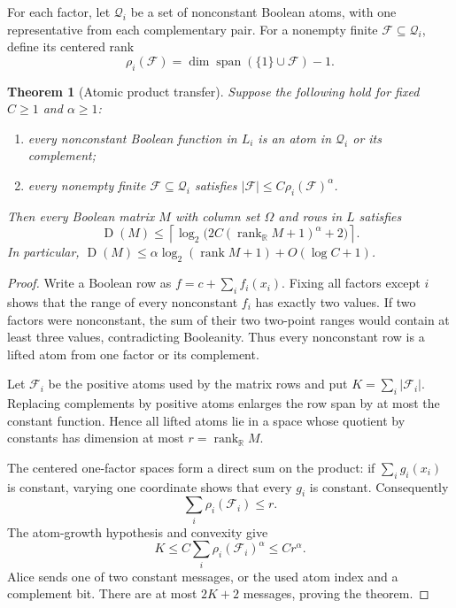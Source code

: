 \documentclass[11pt]{article}
\newtheorem{theorem}{Theorem}[section]
\theoremstyle{definition}
\theoremstyle{remark}
\newcommand{\R}{\mathbb R}
\newcommand{\1}{\mathbf 1}
\newcommand{\rank}{\operatorname{rank}}
\newcommand{\Dcc}{\operatorname{D}}
\begin{document}
For each factor, let $\mathcal Q_i$ be a set of nonconstant Boolean atoms,
with one representative from each complementary pair.  For a nonempty
finite $\mathcal F\subseteq\mathcal Q_i$, define its centered rank
\[
 \rho_i(\mathcal F)
 =\dim\operatorname{span}(\{1\}\cup\mathcal F)-1.
\]

\begin{theorem}[Atomic product transfer]\label{thm:atomic-transfer}
Suppose the following hold for fixed $C\ge1$ and $\alpha\ge1$:
\begin{enumerate}
\item every nonconstant Boolean function in $L_i$ is an atom in
      $\mathcal Q_i$ or its complement;
\item every nonempty finite $\mathcal F\subseteq\mathcal Q_i$ satisfies
      $|\mathcal F|\le C\rho_i(\mathcal F)^\alpha$.
\end{enumerate}
Then every Boolean matrix $M$ with column set $\Omega$ and rows in $L$
satisfies
\[
 \Dcc(M)\le
 \left\lceil\log_2\bigl(2C(\rank_{\R}M+1)^\alpha+2\bigr)\right\rceil.
\]
In particular, $\Dcc(M)\le\alpha\log_2(\rank M+1)+O(\log C+1)$.
\end{theorem}

\begin{proof}
Write a Boolean row as $f=c+\sum_i f_i(x_i)$.  Fixing all factors except
$i$ shows that the range of every nonconstant $f_i$ has exactly two values.
If two factors were nonconstant, the sum of their two two-point ranges would
contain at least three values, contradicting Booleanity.  Thus every
nonconstant row is a lifted atom from one factor or its complement.

Let $\mathcal F_i$ be the positive atoms used by the matrix rows and put
$K=\sum_i|\mathcal F_i|$.  Replacing complements by positive atoms enlarges
the row span by at most the constant function.  Hence all lifted atoms lie in
a space whose quotient by constants has dimension at most
$r=\rank_{\R}M$.

The centered one-factor spaces form a direct sum on the product: if
$\sum_i g_i(x_i)$ is constant, varying one coordinate shows that every
$g_i$ is constant.  Consequently
\[
 \sum_i\rho_i(\mathcal F_i)\le r.
\]
The atom-growth hypothesis and convexity give
\[
 K\le C\sum_i\rho_i(\mathcal F_i)^\alpha
 \le C r^\alpha.
\]
Alice sends one of two constant messages, or the used atom index and a
complement bit.  There are at most $2K+2$ messages, proving the theorem.
\end{proof}
\end{document}

